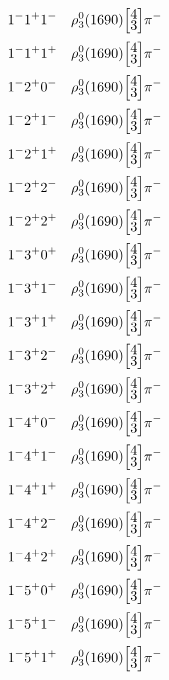 \documentclass[10pt,a4paper]{article}
\def\dst{\displaystyle}
\def\vsp{\hbox{\vrule height12.5pt depth3.5pt width0pt}}
\def\ells#1#2{\Big[\hskip-5pt\vsp\begin{array}{c}\dst#1\\[-4pt]\dst#2\end{array}\vsp\hskip-5pt\Big]}
\begin{document}
\begin{align*} 
 \begin{aligned}
1^{-}1^{+}1^{-}\quad & \rho_3^0(1690)\ells{4}{3}\pi^-\\
1^{-}1^{+}1^{+}\quad & \rho_3^0(1690)\ells{4}{3}\pi^-\\
1^{-}2^{+}0^{-}\quad & \rho_3^0(1690)\ells{4}{3}\pi^-\\
1^{-}2^{+}1^{-}\quad & \rho_3^0(1690)\ells{4}{3}\pi^-\\
1^{-}2^{+}1^{+}\quad & \rho_3^0(1690)\ells{4}{3}\pi^-\\
1^{-}2^{+}2^{-}\quad & \rho_3^0(1690)\ells{4}{3}\pi^-\\
1^{-}2^{+}2^{+}\quad & \rho_3^0(1690)\ells{4}{3}\pi^-\\
1^{-}3^{+}0^{+}\quad & \rho_3^0(1690)\ells{4}{3}\pi^-\\
1^{-}3^{+}1^{-}\quad & \rho_3^0(1690)\ells{4}{3}\pi^-\\
1^{-}3^{+}1^{+}\quad & \rho_3^0(1690)\ells{4}{3}\pi^-\\
1^{-}3^{+}2^{-}\quad & \rho_3^0(1690)\ells{4}{3}\pi^-\\
1^{-}3^{+}2^{+}\quad & \rho_3^0(1690)\ells{4}{3}\pi^-\\
1^{-}4^{+}0^{-}\quad & \rho_3^0(1690)\ells{4}{3}\pi^-\\
1^{-}4^{+}1^{-}\quad & \rho_3^0(1690)\ells{4}{3}\pi^-\\
1^{-}4^{+}1^{+}\quad & \rho_3^0(1690)\ells{4}{3}\pi^-\\
1^{-}4^{+}2^{-}\quad & \rho_3^0(1690)\ells{4}{3}\pi^-\\
1^{-}4^{+}2^{+}\quad & \rho_3^0(1690)\ells{4}{3}\pi^-\\
1^{-}5^{+}0^{+}\quad & \rho_3^0(1690)\ells{4}{3}\pi^-\\
1^{-}5^{+}1^{-}\quad & \rho_3^0(1690)\ells{4}{3}\pi^-\\
1^{-}5^{+}1^{+}\quad & \rho_3^0(1690)\ells{4}{3}\pi^-\\
\end{aligned} 
 \end{align*}\pagebreak
\end{document}
